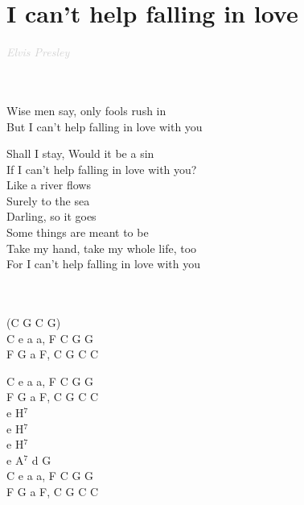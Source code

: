 \documentclass[a5paper, 10pt]{book}
\begin{document}
\section{I can't help falling in love}\textcolor{lightgray}{\textit{Elvis Presley}}\\~\\
\begin{minipage}[t]{0.8\textwidth}
  ~\\
  Wise men say, only fools rush in\\
  But I can't help falling in love with you\vspace*{1.8mm}

  Shall I stay, Would it be a sin\\
  If I can't help falling in love with you?\\

  \hspace*{5mm}Like a river flows\\
  \hspace*{5mm}Surely to the sea\\
  \hspace*{5mm}Darling, so it goes\\
  \hspace*{5mm}Some things are meant to be\\

  Take my hand, take my whole life, too\\
  For I can't help falling in love with you\\
  ~\\
  ~\\
\end{minipage}
\begin{minipage}[t]{0.2\textwidth}
  (C G C G)\\
  C e a a, F C G G\\
  F G a F, C G C C\vspace*{1.8mm}

  C e a a, F C G G\\
  F G a F, C G C C\\

  e H$^7$\\
  e H$^7$\\
  e H$^7$\\
  e A$^7$ d G\\

  C e a a, F C G G\\
  F G a F, C G C C\\

\end{minipage}
\end{document}
